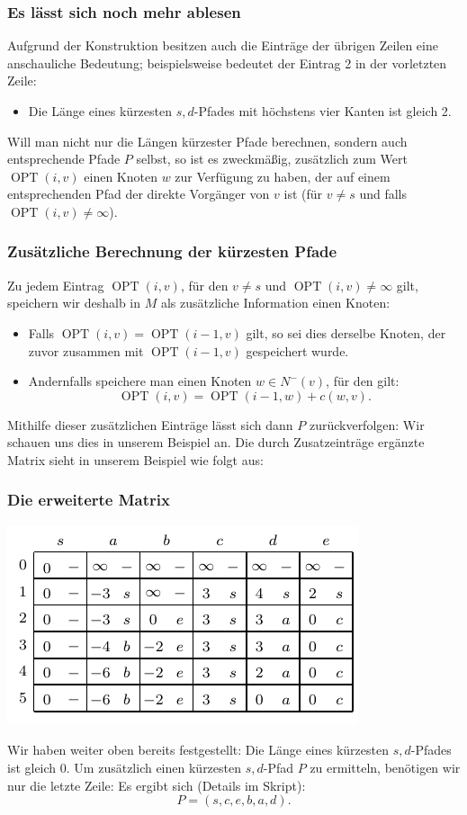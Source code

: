 \documentclass[smaller,xcolor=dvipsnames]{beamer}
\DeclareMathOperator{\opt}{OPT}
\begin{document}
\begin{frame}
\frametitle{Es lässt sich noch mehr ablesen}
Aufgrund der Konstruktion besitzen auch \alert{die Einträge der übrigen Zeilen eine anschauliche Bedeutung;} beispielsweise bedeutet der Eintrag 2 in der vorletzten Zeile:
\begin{itemize}
\item Die Länge eines kürzesten $s,d$-Pfades mit höchstens vier Kanten ist gleich 2.
\end{itemize} \medskip

Will man nicht nur die Längen kürzester Pfade berechnen, sondern auch entsprechende Pfade $P$ selbst, so ist es zweckmäßig, \alert{zusätzlich zum Wert $\opt{(i,v)}$ einen Knoten $w$ zur Verfügung zu haben, der auf einem entsprechenden Pfad der direkte Vorgänger von $v$ ist} (für $v \neq s$ und falls $\opt{(i,v)} \neq \infty$).

\end{frame}

\begin{frame}
\frametitle{Zusätzliche Berechnung der kürzesten Pfade}
Zu jedem Eintrag $\opt{(i,v)}$, für den $v \neq s$ und $\opt{(i,v)} \neq \infty$ gilt, speichern wir deshalb in $M$ als zusätzliche Information einen Knoten:
\begin{itemize}
\item Falls $\opt{(i,v)}=\opt{(i-1,v)}$ gilt, so sei dies derselbe Knoten, der zuvor zusammen mit $\opt{(i-1,v)}$ gespeichert wurde.
\item Andernfalls speichere man einen Knoten $w \in N^-(v)$, für den gilt:
\[
\opt{(i,v)} = \opt{(i-1,w)} + c(w,v).
\]
\end{itemize} \medskip

\alert{Mithilfe dieser zusätzlichen Einträge lässt sich dann $P$ zurückverfolgen:} Wir schauen uns dies in unserem Beispiel an. Die durch Zusatzeinträge ergänzte Matrix sieht in unserem Beispiel wie folgt aus:
\end{frame}

\begin{frame}
\frametitle{Die erweiterte Matrix}
\begin{center}
 \includegraphics{fig101.pdf}
\end{center}

Wir haben weiter oben bereits festgestellt: Die Länge eines kürzesten $s,d$-Pfades ist gleich $0$. Um zusätzlich einen kürzesten $s,d$-Pfad $P$ zu ermitteln, \alert{benötigen wir nur die letzte Zeile:} Es ergibt sich (Details im Skript):
\[
P = (s,c,e,b,a,d).
\]
\end{frame}
\end{document}
